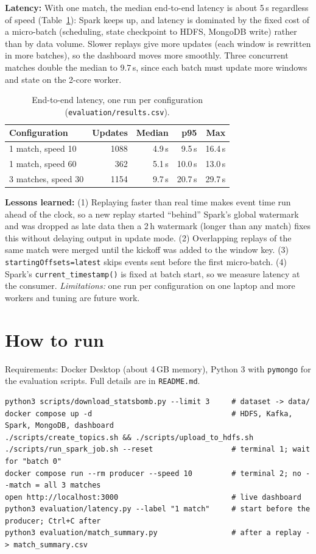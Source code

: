 \documentclass[10pt,a4paper]{article}
\begin{document}
\textbf{Latency:} With one match, the median end-to-end latency is about 5\,s regardless of speed
(Table~\ref{tab:latency}): Spark keeps up, and latency is dominated by the fixed cost of a micro-batch
(scheduling, state checkpoint to HDFS, MongoDB write) rather than by data volume. Slower replays
give more updates (each window is rewritten in more batches), so the dashboard moves more smoothly.
Three concurrent matches double the median to 9.7\,s, since each batch must update more
windows and state on the 2-core worker.

\begin{table}[!htb]
\centering\small
\begin{tabular}{lrrrr}
\toprule
Configuration & Updates & Median & p95 & Max \\
\midrule
1 match, speed 10   & 1088 & 4.9\,s & 9.5\,s  & 16.4\,s \\
1 match, speed 60   &  362 & 5.1\,s & 10.0\,s & 13.0\,s \\
3 matches, speed 30 & 1154 & 9.7\,s & 20.7\,s & 29.7\,s \\
\bottomrule
\end{tabular}
\caption{End-to-end latency, one run per configuration (\texttt{evaluation/results.csv}).}
\label{tab:latency}
\end{table}

\textbf{Lessons learned:} (1) Replaying faster than real time makes event time run ahead of the
clock, so a new replay started ``behind'' Spark's global watermark and was dropped as late data then a
2\,h watermark (longer than any match) fixes this without delaying output in update mode.
(2) Overlapping replays of the same match were merged until the kickoff was added to the window key.
(3) \texttt{startingOffsets=latest} skips events sent before the first micro-batch.
(4) Spark's \texttt{current\_timestamp()} is fixed at batch start, so we measure latency at the
consumer. \emph{Limitations:} one run per configuration on one laptop and more workers and tuning are future work.

\section{How to run}
Requirements: Docker Desktop (about 4\,GB memory), Python 3 with \texttt{pymongo} for the evaluation
scripts. Full details are in \texttt{README.md}.
{\footnotesize
\begin{verbatim}
python3 scripts/download_statsbomb.py --limit 3     # dataset -> data/
docker compose up -d                                # HDFS, Kafka, Spark, MongoDB, dashboard
./scripts/create_topics.sh && ./scripts/upload_to_hdfs.sh
./scripts/run_spark_job.sh --reset                  # terminal 1; wait for "batch 0"
docker compose run --rm producer --speed 10         # terminal 2; no --match = all 3 matches
open http://localhost:3000                          # live dashboard
python3 evaluation/latency.py --label "1 match"     # start before the producer; Ctrl+C after
python3 evaluation/match_summary.py                 # after a replay -> match_summary.csv
\end{verbatim}
}
\end{document}
